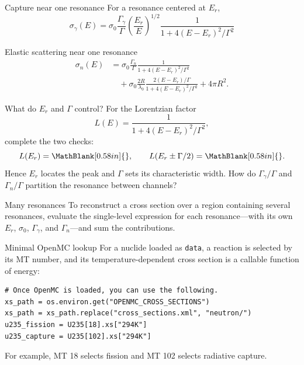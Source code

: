 \begin{handoutcolumns}
\switchcolumn


\begin{fixedbox}{Capture near one resonance}
For a resonance centered at $E_r$,
\[
\boxed{\sigma_{\gamma}(E)
 = \sigma_0\frac{\Gamma_{\gamma}}{\Gamma}
   \left(\frac{E_r}{E}\right)^{1/2}
   \frac{1}{1+4(E-E_r)^2/\Gamma^2}}
\tag{FNRP 2.41}
\]
\end{fixedbox}

\begin{fixedbox}{Elastic scattering near one resonance}
\footnotesize
\begin{align*}
\sigma_n(E)
 &= \sigma_0\frac{\Gamma_n}{\Gamma}
    \frac{1}{1+4(E-E_r)^2/\Gamma^2} \\
 &\quad +\sigma_0\frac{2R}{\lambda_0}
    \frac{2(E-E_r)/\Gamma}{1+4(E-E_r)^2/\Gamma^2}
    +4\pi R^2 .
\tag{FNRP 2.42}
\end{align*}
\normalsize
\end{fixedbox}

\begin{boardbox}{What do $E_r$ and $\Gamma$ control?}
For the Lorentzian factor
\[
 L(E)=\frac{1}{1+4(E-E_r)^2/\Gamma^2},
\]
complete the two checks:
\[
 L(E_r)=\MathBlank[0.58in]{},
 \qquad
 L(E_r\pm\Gamma/2)=\MathBlank[0.58in]{}.
\]
Hence $E_r$ locates the peak and $\Gamma$ sets its characteristic width.
How do $\Gamma_\gamma/\Gamma$ and $\Gamma_n/\Gamma$ partition the resonance
between channels?
\end{boardbox}

\begin{fixedbox}{Many resonances}
To reconstruct a cross section over a region containing several resonances,
evaluate the single-level expression for each resonance---with its own
$E_r$, $\sigma_0$, $\Gamma_\gamma$, and $\Gamma_n$---and sum the contributions.
\end{fixedbox}

\begin{fixedbox}{Minimal OpenMC lookup}
\scriptsize
For a nuclide loaded as \texttt{data}, a reaction is selected by its MT number,
and its temperature-dependent cross section is a callable function of energy:

\begin{verbatim}
# Once OpenMC is loaded, you can use the following.
xs_path = os.environ.get("OPENMC_CROSS_SECTIONS")
xs_path = xs_path.replace("cross_sections.xml", "neutron/")
u235_fission = U235[18].xs["294K"]
u235_capture = U235[102].xs["294K"]
\end{verbatim}

For example, MT 18 selects fission and MT 102 selects radiative capture.
\normalsize
\end{fixedbox}

\end{handoutcolumns}

